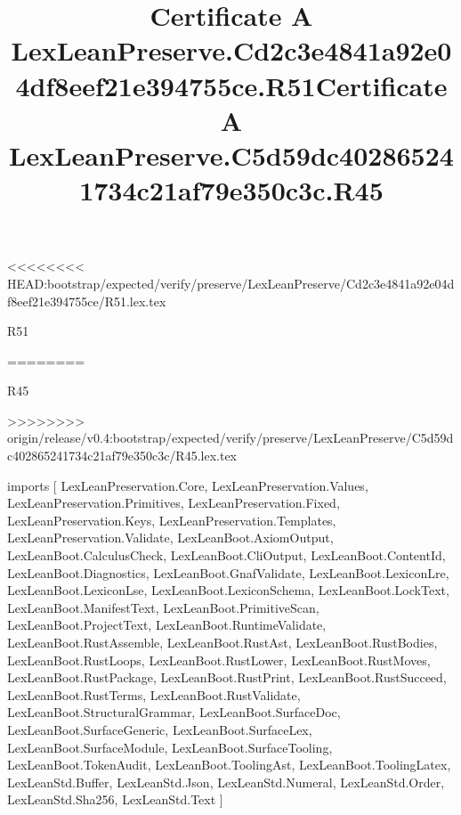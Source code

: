<<<<<<<< HEAD:bootstrap/expected/verify/preserve/LexLeanPreserve/Cd2c3e4841a92e04df8eef21e394755ce/R51.lex.tex
\begin{lexlean}{R51}
\title{Certificate A LexLeanPreserve.Cd2c3e4841a92e04df8eef21e394755ce.R51}
========
\begin{lexlean}{R45}
\title{Certificate A LexLeanPreserve.C5d59dc402865241734c21af79e350c3c.R45}
>>>>>>>> origin/release/v0.4:bootstrap/expected/verify/preserve/LexLeanPreserve/C5d59dc402865241734c21af79e350c3c/R45.lex.tex
\begin{coremodule}
imports [
  LexLeanPreservation.Core,
  LexLeanPreservation.Values,
  LexLeanPreservation.Primitives,
  LexLeanPreservation.Fixed,
  LexLeanPreservation.Keys,
  LexLeanPreservation.Templates,
  LexLeanPreservation.Validate,
  LexLeanBoot.AxiomOutput,
  LexLeanBoot.CalculusCheck,
  LexLeanBoot.CliOutput,
  LexLeanBoot.ContentId,
  LexLeanBoot.Diagnostics,
  LexLeanBoot.GnafValidate,
  LexLeanBoot.LexiconLre,
  LexLeanBoot.LexiconLse,
  LexLeanBoot.LexiconSchema,
  LexLeanBoot.LockText,
  LexLeanBoot.ManifestText,
  LexLeanBoot.PrimitiveScan,
  LexLeanBoot.ProjectText,
  LexLeanBoot.RuntimeValidate,
  LexLeanBoot.RustAssemble,
  LexLeanBoot.RustAst,
  LexLeanBoot.RustBodies,
  LexLeanBoot.RustLoops,
  LexLeanBoot.RustLower,
  LexLeanBoot.RustMoves,
  LexLeanBoot.RustPackage,
  LexLeanBoot.RustPrint,
  LexLeanBoot.RustSucceed,
  LexLeanBoot.RustTerms,
  LexLeanBoot.RustValidate,
  LexLeanBoot.StructuralGrammar,
  LexLeanBoot.SurfaceDoc,
  LexLeanBoot.SurfaceGeneric,
  LexLeanBoot.SurfaceLex,
  LexLeanBoot.SurfaceModule,
  LexLeanBoot.SurfaceTooling,
  LexLeanBoot.TokenAudit,
  LexLeanBoot.ToolingAst,
  LexLeanBoot.ToolingLatex,
  LexLeanStd.Buffer,
  LexLeanStd.Json,
  LexLeanStd.Numeral,
  LexLeanStd.Order,
  LexLeanStd.Sha256,
  LexLeanStd.Text
]


\end{coremodule}
\end{lexlean}
\end{lexlean}
